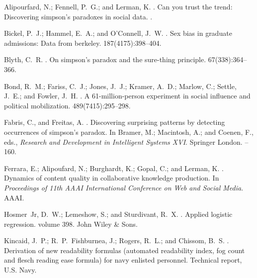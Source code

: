 \documentclass[letterpaper]{article} %
\begin{document}
\small
%
%
\begin{thebibliography}{}

Alipourfard, N.; Fennell, P.~G.; and Lerman, K.
.
\newblock Can you trust the trend: Discovering simpson's paradoxes in social
  data.
.

Bickel, P.~J.; Hammel, E.~A.; and O'Connell, J.~W.
.
\newblock Sex bias in graduate admissions: Data from berkeley.
 187(4175):398--404.

Blyth, C.~R.
.
\newblock On simpson's paradox and the sure-thing principle.
  67(338):364--366.

Bond, R.~M.; Fariss, C.~J.; Jones, J.~J.; Kramer, A.~D.; Marlow, C.; Settle,
  J.~E.; and Fowler, J.~H.
.
\newblock A 61-million-person experiment in social influence and political
  mobilization.
 489(7415):295--298.

Fabris, C., and Freitas, A.
.
\newblock Discovering surprising patterns by detecting occurrences of simpson's
  paradox.
\newblock In Bramer, M.; Macintosh, A.; and Coenen, F., eds., {\em Research and
  Development in Intelligent Systems XVI}. Springer London.
--160.

Ferrara, E.; Alipoufard, N.; Burghardt, K.; Gopal, C.; and Lerman, K.
.
\newblock Dynamics of content quality in collaborative knowledge production.
\newblock In {\em Proceedings of 11th AAAI International Conference on Web and
  Social Media}.
\newblock AAAI.

Hosmer~Jr, D.~W.; Lemeshow, S.; and Sturdivant, R.~X.
.
\newblock Applied logistic regression.
\newblock volume 398.
\newblock John Wiley \& Sons.

Kincaid, J.~P.; R.~P.~Fishburnea, J.; Rogers, R.~L.; and Chissom, B.~S.
.
\newblock Derivation of new readability formulas (automated readability index,
  fog count and flesch reading ease formula) for navy enlisted personnel.
\newblock Technical report, U.S. Navy.


\end{thebibliography}
\end{document}
